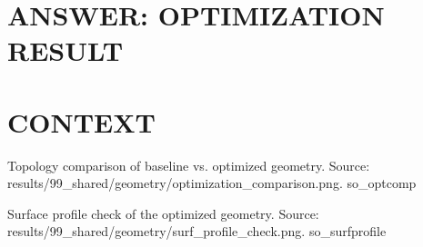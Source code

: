 \documentclass[aspectratio=169,11pt]{beamer}
\begin{document}
\section{ANSWER: OPTIMIZATION RESULT}


\section{CONTEXT}
  {%
   Topology comparison of baseline vs. optimized geometry.
   Source: results/99\_shared/geometry/optimization\_comparison.png.}
  {so_optcomp}

  {%
   Surface profile check of the optimized geometry.
   Source: results/99\_shared/geometry/surf\_profile\_check.png.}
  {so_surfprofile}
\end{document}
